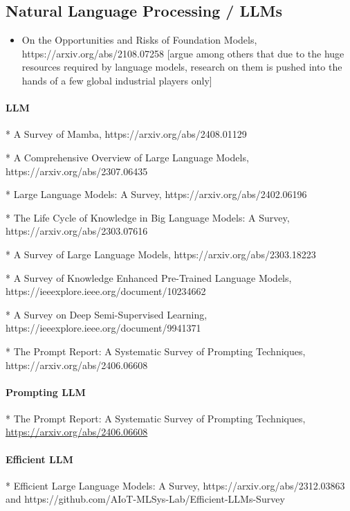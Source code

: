 \subsection{Natural Language Processing / LLMs}

\begin{itemize}
\item On the Opportunities and Risks of Foundation Models, https://arxiv.org/abs/2108.07258 [argue among others that due to the huge resources required by language models, research on them is pushed into the hands of a few global industrial players only]
\end{itemize}

\paragraph{LLM}

* A Survey of Mamba, https://arxiv.org/abs/2408.01129

* A Comprehensive Overview of Large Language Models, https://arxiv.org/abs/2307.06435

* Large Language Models: A Survey, https://arxiv.org/abs/2402.06196

* The Life Cycle of Knowledge in Big Language Models: A Survey, https://arxiv.org/abs/2303.07616

* A Survey of Large Language Models, https://arxiv.org/abs/2303.18223

* A Survey of Knowledge Enhanced Pre-Trained Language Models, https://ieeexplore.ieee.org/document/10234662

* A Survey on Deep Semi-Supervised Learning, https://ieeexplore.ieee.org/document/9941371

* The Prompt Report: A Systematic Survey of Prompting Techniques, https://arxiv.org/abs/2406.06608

\paragraph{Prompting LLM}

* The Prompt Report: A Systematic Survey of Prompting Techniques, \url{https://arxiv.org/abs/2406.06608}

\paragraph{Efficient LLM}

* Efficient Large Language Models: A Survey, https://arxiv.org/abs/2312.03863 and https://github.com/AIoT-MLSys-Lab/Efficient-LLMs-Survey

